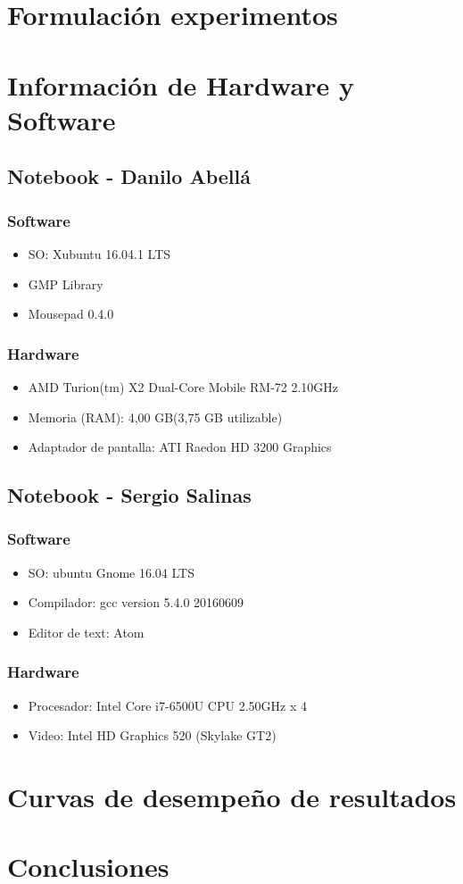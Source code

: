 \documentclass[12pt,letterpaper]{scrartcl}
\begin{document}
\newpage
\section{Formulación experimentos}

\section{Información de Hardware y Software}


\subsection{ Notebook - Danilo Abellá}
\subsubsection{Software}
\begin{itemize}
\item SO: Xubuntu 16.04.1 LTS
\item GMP Library
\item Mousepad 0.4.0
\end{itemize}

\subsubsection{Hardware}
\begin{itemize}
\item AMD Turion(tm) X2 Dual-Core Mobile RM-72 2.10GHz
\item Memoria (RAM): 4,00 GB(3,75 GB utilizable)
\item Adaptador de pantalla: ATI Raedon HD 3200 Graphics
\end{itemize}



\subsection{Notebook - Sergio Salinas}
\subsubsection{Software}
\begin{itemize}
\item  SO: ubuntu Gnome 16.04 LTS
\item Compilador: gcc version 5.4.0 20160609 
\item Editor de text: Atom
\end{itemize}

\subsubsection{Hardware}
\begin{itemize}
\item Procesador: Intel Core i7-6500U CPU  2.50GHz x 4 
\item Video: Intel HD Graphics 520 (Skylake GT2) 
\end{itemize}


\newpage

\section{Curvas de desempeño de resultados}
\newpage
\section{Conclusiones}
\end{document}
